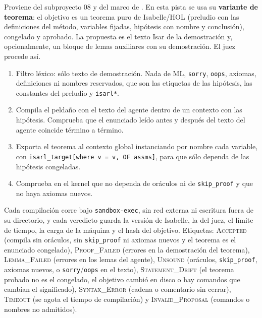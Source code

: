 \documentclass[11pt,a4paper]{article}
\begin{document}
Proviene del subproyecto 08 y del marco de \citet{BryantHuertaFoster2026}. En esta pista se usa su \textbf{variante de teorema}: el objetivo es un teorema puro de Isabelle/HOL (preludio con las definiciones del método, variables fijadas, hipótesis con nombre y conclusión), congelado y aprobado. La propuesta es el texto Isar de la demostración y, opcionalmente, un bloque de lemas auxiliares con su demostración. El juez procede así.
\begin{enumerate}
  \item Filtro léxico: sólo texto de demostración. Nada de ML, \texttt{sorry}, \texttt{oops}, axiomas, definiciones ni nombres reservados, que son las etiquetas de las hipótesis, las constantes del preludio y \texttt{isarl*}.
  \item Compila el peldaño con el texto del agente dentro de un contexto con las hipótesis. Comprueba que el enunciado leído antes y después del texto del agente coincide término a término.
  \item Exporta el teorema al contexto global instanciando por nombre cada variable, con \texttt{isarl\_\allowbreak{}target[where v =\allowbreak{} v,\allowbreak{} OF assms]}, para que sólo dependa de las hipótesis congeladas.
  \item Comprueba en el kernel que no dependa de oráculos ni de \texttt{skip\_proof} y que no haya axiomas nuevos.
\end{enumerate}
Cada compilación corre bajo \texttt{sandbox-exec}, sin red externa ni escritura fuera de su directorio, y cada veredicto guarda la versión de Isabelle, la del juez, el límite de tiempo, la carga de la máquina y el hash del objetivo. Etiquetas: \textsc{Accepted} (compila sin oráculos, sin \texttt{skip\_proof} ni axiomas nuevos y el teorema es el enunciado congelado), \textsc{Proof\_Failed} (errores en la demostración del teorema), \textsc{Lemma\_Failed} (errores en los lemas del agente), \textsc{Unsound} (oráculos, \texttt{skip\_proof}, axiomas nuevos, o \texttt{sorry}/\texttt{oops} en el texto), \textsc{Statement\_Drift} (el teorema probado no es el congelado, el objetivo cambió en disco o hay comandos que cambian el significado), \textsc{Syntax\_Error} (cadena o comentario sin cerrar), \textsc{Timeout} (se agota el tiempo de compilación) y \textsc{Invalid\_Proposal} (comandos o nombres no admitidos).
\end{document}
